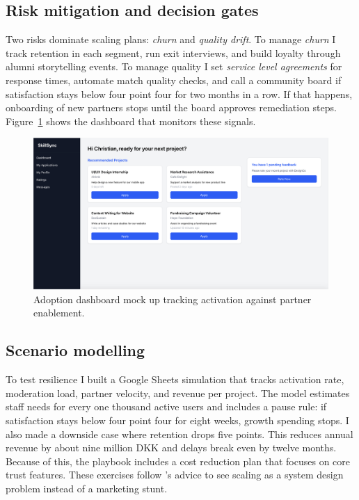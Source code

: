 \subsection*{Risk mitigation and decision gates}
Two risks dominate scaling plans: \textit{churn} and \textit{quality drift}. To manage \textit{churn} I track retention in each segment, run exit interviews, and build loyalty through alumni storytelling events. To manage quality I set \textit{service level agreements} for response times, automate match quality checks, and call a community board if satisfaction stays below four point four for two months in a row. If that happens, onboarding of new partners stops until the board approves remediation steps. Figure~\ref{fig:scaling-dashboard} shows the dashboard that monitors these signals.

\begin{figure}[H]
  \centering
  \includegraphics[width=0.75\linewidth]{figures/Student-Dashboard.png}
  \caption{Adoption dashboard mock up tracking activation against partner enablement.}
  \label{fig:scaling-dashboard}
\end{figure}

\subsection*{Scenario modelling}
To test resilience I built a Google Sheets simulation that tracks activation rate, moderation load, partner velocity, and revenue per project. The model estimates staff needs for every one thousand active users and includes a pause rule: if satisfaction stays below four point four for eight weeks, growth spending stops. I also made a downside case where retention drops five points. This reduces annual revenue by about nine million DKK and delays break even by twelve months. Because of this, the playbook includes a cost reduction plan that focuses on core trust features. These exercises follow \citet{Lecture12}'s advice to see scaling as a system design problem instead of a marketing stunt.
